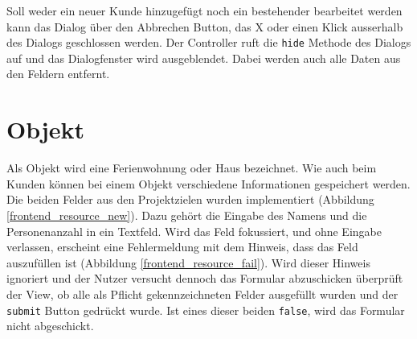 Soll weder ein neuer Kunde hinzugefügt noch ein bestehender bearbeitet werden kann das Dialog über den \grqq Abbrechen\glqq{}  Button, das \grqq X\glqq{}  oder einen
Klick ausserhalb des Dialogs geschlossen werden. Der Controller ruft die \texttt{hide} Methode des Dialogs auf und das Dialogfenster wird ausgeblendet. Dabei werden auch alle Daten aus den Feldern entfernt.

\section{Objekt}
Als Objekt wird eine Ferienwohnung oder Haus bezeichnet. Wie auch beim Kunden können bei einem Objekt verschiedene Informationen gespeichert werden. Die beiden Felder aus den Projektzielen wurden implementiert (Abbildung \ref{frontend_resource_new}). Dazu gehört die Eingabe des Namens und die Personenanzahl in ein Textfeld. Wird das Feld fokussiert, und ohne Eingabe verlassen, erscheint eine Fehlermeldung mit dem Hinweis, dass das Feld auszufüllen ist (Abbildung \ref{frontend_resource_fail}). Wird dieser Hinweis ignoriert und der Nutzer versucht dennoch das Formular abzuschicken überprüft der View, ob alle als Pflicht gekennzeichneten Felder ausgefüllt wurden und der \texttt{submit} Button gedrückt wurde. Ist eines dieser beiden \texttt{false}, wird das Formular nicht abgeschickt.

